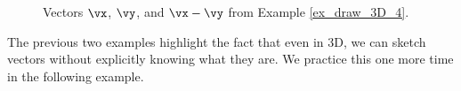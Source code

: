 {\begin{figure}[h!]
\begin{center}
\end{center}
\caption{Vectors $\protect\vx$, $\protect\vy$, and $\protect\vx - \protect\vy$ from Example \ref{ex_draw_3D_4}.}
\label{fig:draw_3D_4}
\end{figure}
} %

The previous two examples highlight the fact that even in 3D, we can sketch vectors without explicitly knowing what they are. We practice this one more time in the following example.\\

